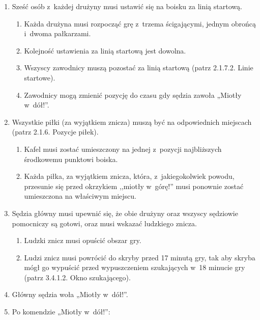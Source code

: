 \documentclass[12pt,a4paper]{article}
\begin{document}
\begin{enumerate}
	\item
	      Sześć osób z~każdej drużyny musi ustawić się na boisku za linią startową.

	      \begin{enumerate}
		      \item
		            Każda drużyna musi rozpocząć grę z~trzema ścigającymi, jednym
		            obrońcą i~dwoma pałkarzami.
		      \item
				Kolejność ustawienia za linią startową jest dowolna.
		      \item
		            Wszyscy zawodnicy muszą pozostać za linią startową (patrz 2.1.7.2.
		            Linie startowe).
		      \item
		            Zawodnicy mogą zmienić pozycję do czasu gdy sędzia zawoła „Miotły w~dół!''.
	      \end{enumerate}
	\item
	      Wszystkie piłki (za wyjątkiem znicza) muszą być na odpowiednich
	      miejscach (patrz 2.1.6. Pozycje piłek).

	      \begin{enumerate}
		      \item
		            Kafel musi zostać umieszczony na jednej z~pozycji najbliższych
		            środkowemu punktowi boiska.
		      \item
				Każda piłka, za wyjątkiem znicza, która, z~jakiegokolwiek powodu,
		            przesunie się przed okrzykiem ,,miotły w~górę!'' musi ponownie
		            zostać umieszczona na właściwym miejscu.
	      \end{enumerate}
	\item
	      Sędzia główny musi upewnić się, że obie drużyny oraz wszyscy sędziowie
	      pomocniczy są gotowi, oraz musi wskazać ludzkiego znicza.

	      \begin{enumerate}
		      \item
		            Ludzki znicz musi opuścić obszar gry.
		      \item
		            Ludzi znicz musi powrócić do skryby przed 17 minutą gry, tak aby
		            skryba mógł go wypuścić przed wypuszczeniem szukających w~18 minucie
		            gry (patrz 3.4.1.2. Okno szukającego).
	      \end{enumerate}
	\item
	      Główny sędzia woła „Miotły w~dół!''.
	\item
	      Po komendzie „Miotły w~dół!'':


\end{enumerate}
\end{document}
